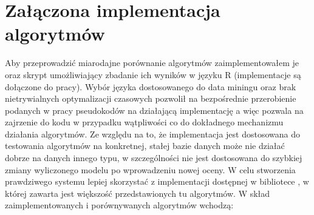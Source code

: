\documentclass{pracamgr}
\begin{document}
  \section{Załączona implementacja algorytmów}
   Aby przeprowadzić miarodajne porównanie algorytmów zaimplementowałem je oraz skrypt umożliwiający zbadanie ich wyników w języku R
   (implementacje są dołączone do pracy).
   Wybór języka dostosowanego do data miningu oraz brak nietrywialnych optymalizacji czasowych pozwolił na bezpośrednie przerobienie
   podanych w pracy pseudokodów na działającą implementację a więc pozwala na zajrzenie do kodu w przypadku wątpliwości co do dokładnego
   mechanizmu działania algorytmów.
   Ze względu na to, że implementacja jest dostosowana do testowania algorytmów na konkretnej, stałej bazie danych może nie działać dobrze
   na danych innego typu, w szczególności nie jest dostosowana do szybkiej zmiany wyliczonego modelu po wprowadzeniu nowej oceny.
   W celu stworzenia prawdziwego systemu lepiej skorzystać z implementacji dostępnej w bibliotece \cite{MML}, w której zawarta jest
   większość przedstawionych tu algorytmów.\newline
   W skład zaimplementowanych i porównywanych algorytmów wchodzą:
\end{document}
